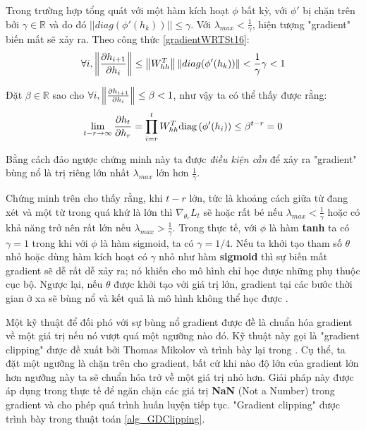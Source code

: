 Trong trường hợp tổng quát với một hàm kích hoạt $\phi$ bất kỳ, với $\phi'$ bị chặn trên bởi $\gamma \in \mathbb{R}$ và do đó $||diag(\phi'(h_k))|| \leq \gamma$. Với $\lambda_{max} < \frac{1}{\gamma}$, hiện tượng "gradient" biến mất sẽ xảy ra. Theo công thức \ref{gradientWRTSt16}:
\begin{equation} \label{gradientVanish5}
	\forall i, \left\lVert\frac{\partial h_{i+1}}{\partial h_{i}}\right\rVert \leq \left\lVert W^T_{hh} \right\rVert \left\lVert diag(\phi'(h_k)) \right\rVert < \frac{1}{\gamma} \gamma < 1 
\end{equation}

Đặt $\beta \in \mathbb{R}$ sao cho $\forall i, \left\lVert\frac{\partial h_{i+1}}{\partial h_{i}}\right\rVert \leq \beta < 1$, như vậy ta có thể thấy được rằng:
\begin{equation} \label{gradientVanish3}
	\lim_{t - r \to \infty} \frac{\partial h_{t}}{\partial h_r} = \prod_{i=r}^{t} W_{hh}^T \mathrm{diag} \left(\phi'(h_i) \right) \leq \beta^{t - r} = 0
\end{equation}

Bằng cách đảo ngược chứng minh này ta được \textit{điều kiện cần} để xảy ra "gradient" bùng nổ là trị riêng lớn nhất $\lambda_{max}$ lớn hơn $\frac{1}{\gamma}$.

Chứng minh trên cho thấy rằng, khi $t-r$ lớn, tức là khoảng cách giữa từ đang xét và một từ trong quá khứ là lớn thì $\nabla_{\theta_r} L_t$ sẽ hoặc rất bé nếu $\lambda_{max} < \frac{1}{\gamma}$ hoặc có khả năng trở nên rất lớn nếu $\lambda_{max} > \frac{1}{\gamma}$. Trong thực tế, với $\phi$ là hàm \textbf{tanh} ta có $\gamma = 1$ trong khi với $\phi$ là hàm sigmoid, ta có $\gamma = 1/4$. Nếu ta khởi tạo tham số $\theta$ nhỏ hoặc dùng hàm kích hoạt có $\gamma$ nhỏ như hàm \textbf{sigmoid} thì sự biến mất gradient sẽ dễ rất dễ xảy ra; nó khiến cho mô hình chỉ học được những phụ thuộc cục bộ. Ngược lại, nếu $\theta$ được khởi tạo với giá trị lớn, gradient tại các bước thời gian ở xa sẽ bùng nổ và kết quả là mô hình không thể học được \cite{pascanu2011}.

Một kỹ thuật để đối phó với sự bùng nổ gradient được đề là chuẩn hóa gradient về một giá trị nếu nó vượt quá một ngưỡng nào đó. Kỹ thuật này gọi là "gradient clipping" được đề xuất bởi Thomas Mikolov và trình bày lại trong \cite{pascanu2012}. Cụ thể, ta đặt một ngưỡng là chặn trên cho gradient, bất cứ khi nào độ lớn của gradient lớn hơn ngưỡng này ta sẽ chuẩn hóa trở về một giá trị nhỏ hơn. Giải pháp này được áp dụng trong thực tế để ngăn chặn các giá trị \textbf{NaN} (Not a Number) trong gradient và cho phép quá trình huấn luyện tiếp tục. "Gradient clipping" được trình bày trong thuật toán \ref{alg_GDClipping}.

